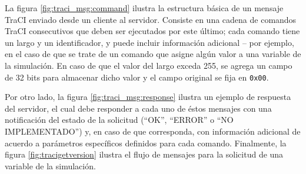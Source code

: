 La figura \ref{fig:traci_msg:command} ilustra la estructura básica de un mensaje TraCI enviado desde un cliente al servidor. Consiste en una cadena de comandos TraCI consecutivos que deben ser ejecutados por este último; cada comando tiene un largo y un identificador, y puede incluir información adicional -- por ejemplo, en el caso de que se trate de un comando que asigne algún valor a una variable de la simulación. En caso de que el valor del largo exceda 255, se agrega un campo de 32 bits para almacenar dicho valor y el campo original se fija en \texttt{0x00}.

Por otro lado, la figura \ref{fig:traci_msg:response} ilustra un ejemplo de respuesta del servidor, el cual debe responder a cada uno de éstos mensajes con una notificación del estado de la solicitud (``OK'', ``ERROR'' o ``NO IMPLEMENTADO'') y, en caso de que corresponda, con información adicional de acuerdo a parámetros específicos definidos para cada comando. Finalmente, la figura \ref{fig:tracigetversion} ilustra el flujo de mensajes para la solicitud de una variable de la simulación.

